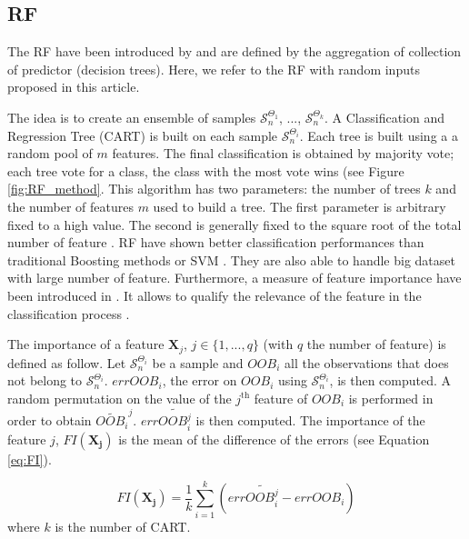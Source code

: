 \subsection*{RF}
The RF have been introduced by \cite{breiman2001random} and are defined by the aggregation of collection of predictor (decision trees). Here, we refer to the RF with random inputs proposed in this article.

The idea is to create an ensemble of samples $\mathcal{S}_{n}^{\Theta_{1}}$, ..., $\mathcal{S}_{n}^{\Theta_{k}}$. A Classification and Regression Tree (CART) \citep{breiman1984classification} is built on each sample $\mathcal{S}_{n}^{\Theta_{i}}$. Each tree is built using a a random pool of $m$ features. The final classification is obtained by majority vote; each tree vote for a class, the class with the most vote wins (see Figure \ref{fig:RF_method}. This algorithm has two parameters: the number of trees $k$ and the number of features $m$ used to build a tree. The first parameter is arbitrary fixed to a high value. The second is generally fixed to the square root of the total number of feature \citep{gislason2006random}.
RF have shown better classification performances than traditional Boosting methods \citep{breiman2001random} or SVM \citep{pal2005random}. They are also able to handle big dataset with large number of feature. Furthermore, a measure of feature importance have been introduced in \cite{breiman2001random}. It allows to qualify the relevance of the feature in the classification process \citep{strobl2007bias}.

The importance of a feature $\mathbf{X}_{j}$, $j\in\{1,...,q\}$ (with $q$ the number of feature) is defined as follow. Let $\mathcal{S}_{n}^{\Theta_{i}}$ be a sample and $OOB_{i}$ all the observations that does not belong to $\mathcal{S}_{n}^{\Theta_{i}}$. $errOOB_{i}$, the error on $OOB_{i}$ using $\mathcal{S}_{n}^{\Theta_{i}}$, is then computed. A random permutation on the value of the $j^{\text{th}}$ feature of $OOB_{i}$ is performed in order to obtain $\widetilde{OOB_{i}}^j$. $err\widetilde{OOB_{i}^{j}}$ is then computed. The importance of the feature $j$, $FI(\mathbf{X_{j}})$ is the mean of the difference of the errors (see Equation \ref{eq:FI}).

\begin{equation}
\label{eq:FI}
FI(\mathbf{X_{j}})=\frac{1}{k}\sum_{i=1}^{k}(err\widetilde{OOB_{i}^{j}}-errOOB_{i})
\end{equation}
where $k$ is the number of CART.

